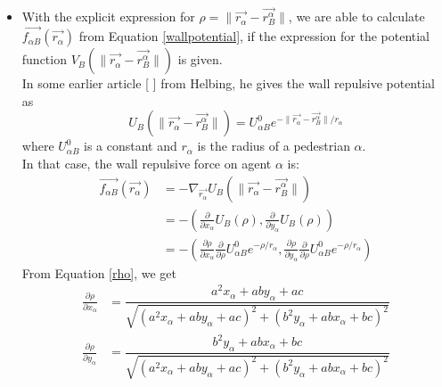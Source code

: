 \begin{itemize}
\item With the explicit expression for $ \rho = \| \vec{r_{\alpha}} - \vec{r_{B}^{\alpha}} \| $, we are able to calculate $ \vec{f_{\alpha B}} \left( \vec{r_{\alpha}} \right) $ from Equation \ref{wallpotential}, if the expression for the potential function $ V_{B}
    \left( \| \vec{r_{\alpha}} - \vec{r_{B}^{\alpha}} \| \right) $ is given.\\
In some earlier article [ ] from Helbing, he gives the wall repulsive potential as
\begin{equation}
U_{B} \left( \| \vec{r_{\alpha}} - \vec{r_{B}^{\alpha}} \| \right) =
U^0_{\alpha B} e^{- \| \vec{r_{\alpha}} - \vec{r_{B}^{\alpha}} \| / r_{\alpha} }
\end{equation}
where $U^0_{\alpha B}$ is a constant and $r_{\alpha}$ is the radius of a pedestrian $\alpha$. \\

In that case, the wall repulsive force on agent $ \alpha $ is:
\begin{align}
    \vec{f_{\alpha B}} \left( \vec{r_{\alpha}} \right) &=
    - \nabla_{\vec{r_{\alpha}}} U_{B}
    \left( \| \vec{r_{\alpha}} - \vec{r_{B}^{\alpha}} \| \right)\\
&=-\left( \frac{\partial}{\partial x_{\alpha}}U_{B}(\rho), \frac{\partial}{\partial y_{\alpha}}U_{B}(\rho)\right) \\
&=-\left( \frac{\partial \rho}{\partial x_{\alpha}}\frac{\partial}{\partial \rho}U^0_{\alpha B} e^{- \rho / r_{\alpha} }, \frac{\partial \rho}{\partial y_{\alpha}}\frac{\partial}{\partial \rho}U^0_{\alpha B} e^{- \rho / r_{\alpha} }\right) 
\end{align}
From Equation \ref{rho}, we get
\begin{align}
\frac{\partial \rho}{\partial x_{\alpha}} &=\dfrac{a^{2}x_{\alpha}+aby_{\alpha}+ac}{\sqrt{\left( a^{2}x_{\alpha}+aby_{\alpha}+ac \right) ^{2} + \left( b^{2}y_{\alpha}+abx_{\alpha}+bc\right) ^{2}}}\\
\frac{\partial \rho}{\partial y_{\alpha}}&=
\dfrac{b^{2}y_{\alpha}+abx_{\alpha}+bc}{\sqrt{\left( a^{2}x_{\alpha}+aby_{\alpha}+ac \right) ^{2} + \left( b^{2}y_{\alpha}+abx_{\alpha}+bc\right) ^{2}}}
\end{align}


\end{itemize}

